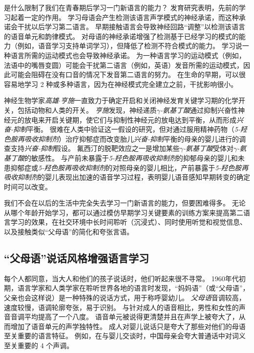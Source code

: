 是什么限制了我们在青春期后学习一门新语言的能力？
发育研究表明，先前的学习起着一定的作用。
学习母语会产生检测该语言声学模式的神经承诺，而这种承诺会干扰以后学习第二语言。
早期接触语言会导致神经回路“调整”以检测该语言的语音单元和韵律模式。
对母语的神经承诺增强了检测基于已经学习的模式的能力（例如，语音学习支持单词学习），但降低了检测不符合模式的能力。
学习说一种语言所需的运动模式也会导致神经承诺。
为一种语言学习的运动模式（例如，法语中的嘴唇变圆）可能会干扰第二语言（例如，英语）发音所需的运动模式，因此可能会阻碍在没有口音的情况下发音第二语言的努力。
在生命的早期，可以很容易地学习 2 种或多种语言，因为在神经模式完全建立之前，干扰影响很小。


神经生物学家\textit{高雄$\cdot$亨施}一直致力于确定开启和关闭神经发育关键学习期的化学开关，包括动物和人类的开关。
\textit{亨施}发现，神经递质\textit{$\gamma$-氨基丁酸}通过抑制兴奋性神经元的放电来开启关键期，使它们与抑制性神经元的放电达到平衡，从而形成\textit{兴奋-抑制}平衡。
很难在人类中验证这一假设的研究，但对通过服用精神药物（\textit{5-羟色胺再吸收抑制剂}）治疗抑郁症而改变胎儿\textit{兴奋-抑制}平衡的母亲的婴儿进行的调查支持\textit{兴奋-抑制}假设。
氟西汀的脱靶效应之一是增加某些\textit{$\gamma$-氨基丁酸}受体对\textit{$\gamma$-氨基丁酸}的敏感性。
与产前未暴露于\textit{5-羟色胺再吸收抑制剂}的抑郁母亲的婴儿和未患抑郁症或\textit{5-羟色胺再吸收抑制剂}的对照母亲的婴儿相比，产前暴露于\textit{5-羟色胺再吸收抑制剂}的婴儿表现出加速的语音学习过程，表明婴儿语音感知早期转变的确定时间可以改变。


我们不会在以后的生活中完全失去学习一门新语言的能力，但要困难得多。
无论从哪个年龄开始学习，都可以通过模仿早期学习关键要素的训练方案来提高第二语言学习的效果，在社交环境中长时间聆听（沉浸式）、同时使用听觉和视觉信息、以及接触类似“父母语”的简化和夸张言语。



\subsection{“父母语”说话风格增强语言学习}

每个人都同意，当大人和他们的孩子说话时，他们听起来很不寻常。
1960年代初期，语言学家和人类学家在聆听世界各地的语言时发现，“妈妈语”（或“父母语”，父亲也会这样说）是一种特殊的说话方式，用于称呼婴幼儿。
\textit{父母语}音调较高，速度较慢，语调轮廓夸张，易于识别。
与针对成人的语音相比，男性和女性的声音音调平均提高了一个八度。
语音单元被说得更清楚并且在声学上被夸大了，从而增加了语音单元的声学独特性。
成人对婴儿说话只是夸大了那些对他们的母语至关重要的语言特征。
例如，在与婴儿交谈时，中国母亲会夸大普通话中对词义至关重要的 4 个声调。


